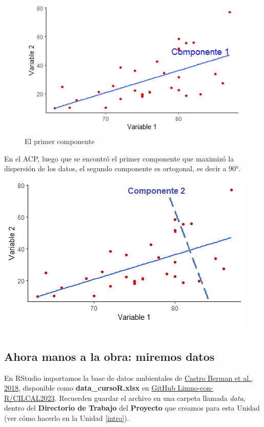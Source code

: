 \documentclass[
]{book}
\begin{document}
\begin{figure}
\centering
\includegraphics{./images/compo_1.png}
\caption{El primer componente}
\end{figure}

En el ACP, luego que se encontró el primer componente que maximizó la dispersión de los datos, el segundo componente es ortogonal, es decir a 90°.

\includegraphics{./images/compo_2.png}

\hypertarget{ahora-manos-a-la-obra-miremos-datos}{%
\subsection{Ahora manos a la obra: miremos datos}\label{ahora-manos-a-la-obra-miremos-datos}}

En RStudio importamos la base de datos ambientales de \href{https://doi.org/10.1016/j.chemosphere.2018.02.103}{Castro Berman et al., 2018}, disponible como \textbf{data\_cursoR.xlsx} en \href{https://github.com/Limno-con-R/CILCAL2023/tree/main/datasets}{GitHub Limno-con-R/CILCAL2023}. Recuerden guardar el archivo en una carpeta llamada \emph{data}, dentro del \textbf{Directorio de Trabajo} del \textbf{Proyecto} que creamos para esta Unidad (ver cómo hacerlo en la Unidad \ref{intro}).
\end{document}
